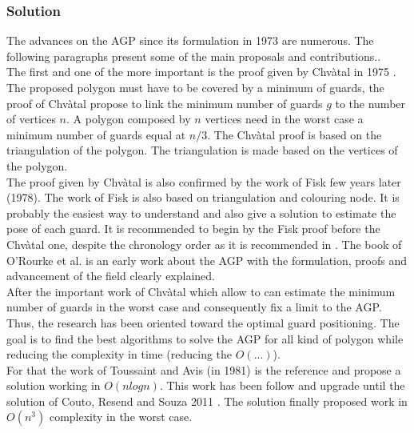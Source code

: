 	\subsubsection{Solution }
	
	The advances on the AGP since its formulation in 1973 are numerous. The following paragraphs present some of the main proposals and contributions..\\
	 The first and one of the more important is the proof given by Chvàtal in 1975 \cite{44*chvatal1975}.  The proposed polygon must have to be covered by a minimum of guards, the proof of Chvàtal propose to link the minimum number of guards $g$ to the number of vertices $n$. 
A polygon composed by $n$ vertices need in the worst case a minimum number of guards equal at $n/3$. The Chvàtal proof is based on the triangulation of the polygon. The triangulation is made based on the vertices of the polygon.\\
	     The proof given by Chvàtal is also confirmed by the work of Fisk  few years later (1978). The work of Fisk is also based on triangulation and colouring node. It is probably the easiest way to understand and also give a solution to estimate the pose of each guard. It is recommended to begin by the Fisk proof before the Chvàtal one, despite the chronology order as it is recommended in \cite{219*orourke1987}. The book of O'Rourke et al. \cite{219*orourke1987} is an early work about the AGP with the formulation, proofs and advancement of the field clearly explained. \\
After the important work of Chvàtal which allow to can estimate the minimum number of guards in the worst case and consequently fix a limit to the AGP. Thus, the research has been oriented toward the optimal guard positioning. The goal is to find the best algorithms to solve the AGP for all kind of polygon while reducing the complexity in time (reducing the $O(...)$).\\
For that the work of Toussaint and Avis (in 1981) is the reference and propose a solution working in $O(n log n)$. This work has been follow and upgrade until the solution of Couto, Resend and Souza  2011 \cite{224*couto2011}. The solution  finally proposed work in $O(n^3)$ complexity in the worst case. 

